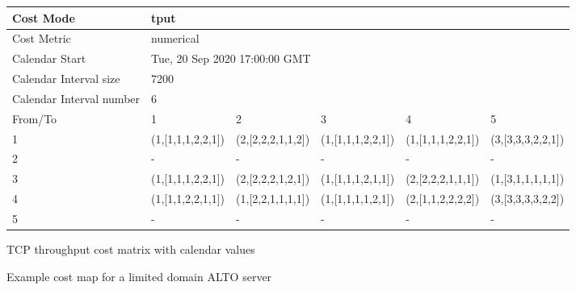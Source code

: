 \begin{figure}
\begin{subtable}{1\linewidth}
        \footnotesize
        \centering
        \hspace*{-2em}
        \begin{tabular}{|l|l|l|l|l|l|}
        \hline
        Cost Mode                & \multicolumn{5}{|l|}{tput}                            \\ \hline
        Cost Metric              & \multicolumn{5}{|l|}{numerical}                       \\ \hline
        Calendar Start           & \multicolumn{5}{|l|}{Tue, 20 Sep 2020 17:00:00 GMT}   \\ \hline
        Calendar Interval size   & \multicolumn{5}{|l|}{7200}                            \\ \hline
        Calendar Interval number & \multicolumn{5}{|l|}{6}                               \\ \hline
        From/To                  & 1                    & 2                     & 3                        & 4                   & 5                  \\ \hline
        1                        & (1,[1,1,1,2,2,1])    & (2,[2,2,2,1,1,2])     & (1,[1,1,1,2,2,1])        & (1,[1,1,1,2,2,1])   & (3,[3,3,3,2,2,1])  \\ \hline
        2                        & -                    & -                     & -                        & -                   & -                  \\ \hline
        3                        & (1,[1,1,1,2,2,1])    & (2,[2,2,2,1,2,1])     & (1,[1,1,1,2,1,1])        & (2,[2,2,2,1,1,1])   & (1,[3,1,1,1,1,1])  \\ \hline
        4                        & (1,[1,1,2,2,1,1])    & (1,[2,2,1,1,1,1])     & (1,[1,1,1,1,2,1])        & (2,[1,1,2,2,2,2])   & (3,[3,3,3,3,2,2])  \\ \hline
        5                        & -                    & -                     & -                        & -                   & -                  \\ \hline
        \end{tabular}
    \caption{TCP throughput cost matrix with calendar values}
    \end{subtable}

    \caption{Example cost map for a limited domain ALTO server}
    \label{table:costmap-example-boundary}
\end{figure}



